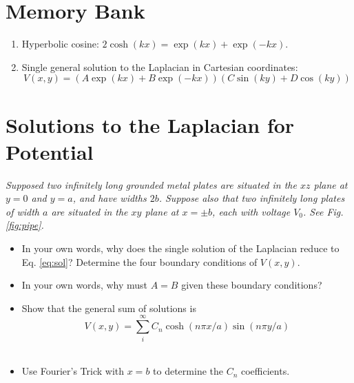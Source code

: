 \documentclass[12pt]{article}
\begin{document}
\maketitle

\section{Memory Bank}

\begin{enumerate}
\item Hyperbolic cosine: $2\cosh(kx) = \exp(k x) + \exp(-kx)$.
\item Single general solution to the Laplacian in Cartesian coordinates:
\begin{equation}
V(x,y) = \left( A\exp(kx) + B\exp(-kx) \right) \left( C\sin(ky) + D\cos(ky) \right) \label{eq:sol}
\end{equation}
\end{enumerate}

\section{Solutions to the Laplacian for Potential}

\textit{Supposed two infinitely long grounded metal plates are situated in the $xz$ plane at $y=0$ and $y=a$, and have widths $2b$.  Suppose also that two infinitely long plates of width $a$ are situated in the $xy$ plane at $x = \pm b$, each with voltage $V_0$.  See Fig. \ref{fig:pipe}.}

\begin{itemize}
\item In your own words, why does the single solution of the Laplacian reduce to Eq. \ref{eq:sol}?  Determine the four boundary conditions of $V(x,y)$. \\
\item In your own words, why must $A = B$ given these boundary conditions? \\
\item Show that the general sum of solutions is
\begin{equation}
V(x,y) = \sum_i^{\infty} C_n \cosh(n\pi x/a) \sin(n\pi y/a) \label{eq:sol2}
\end{equation} \\
\item Use Fourier's Trick with $x = b$ to determine the $C_n$ coefficients.
\end{itemize}
\end{document}
